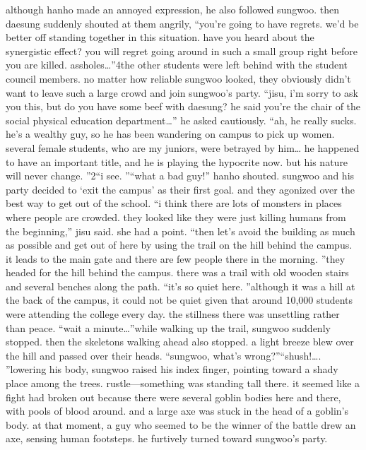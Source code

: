  although hanho made an annoyed expression, he also followed sungwoo.
then daesung suddenly shouted at them angrily, “you’re going to have regrets.
 we’d be better off standing together in this situation.
 have you heard about the synergistic effect? you will regret going around in such a small group right before you are killed.
 assholes…”4the other students were left behind with the student council members.
 no matter how reliable sungwoo looked, they obviously didn’t want to leave such a large crowd and join sungwoo’s party.
“jisu, i’m sorry to ask you this, but do you have some beef with daesung? he said you’re the chair of the social physical education department…” he asked cautiously.
“ah, he really sucks.
 he’s a wealthy guy, so he has been wandering on campus to pick up women.
 several female students, who are my juniors, were betrayed by him… he happened to have an important title, and he is playing the hypocrite now.
 but his nature will never change.
”2“i see.
”“what a bad guy!” hanho shouted.
sungwoo and his party decided to ‘exit the campus’ as their first goal.
and they agonized over the best way to get out of the school.
“i think there are lots of monsters in places where people are crowded.
 they looked like they were just killing humans from the beginning,” jisu said.
she had a point.
“then let’s avoid the building as much as possible and get out of here by using the trail on the hill behind the campus.
 it leads to the main gate and there are few people there in the morning.
”they headed for the hill behind the campus.
 there was a trail with old wooden stairs and several benches along the path.
“it’s so quiet here.
”although it was a hill at the back of the campus, it could not be quiet given that around 10,000 students were attending the college every day.
 the stillness there was unsettling rather than peace.
“wait a minute…”while walking up the trail, sungwoo suddenly stopped.
 then the skeletons walking ahead also stopped.
a light breeze blew over the hill and passed over their heads.
“sungwoo, what’s wrong?”“shush!….
”lowering his body, sungwoo raised his index finger, pointing toward a shady place among the trees.
rustle—something was standing tall there.
 it seemed like a fight had broken out because there were several goblin bodies here and there, with pools of blood around.
 and a large axe was stuck in the head of a goblin’s body.
at that moment, a guy who seemed to be the winner of the battle drew an axe, sensing human footsteps.
 he furtively turned toward sungwoo’s party.


